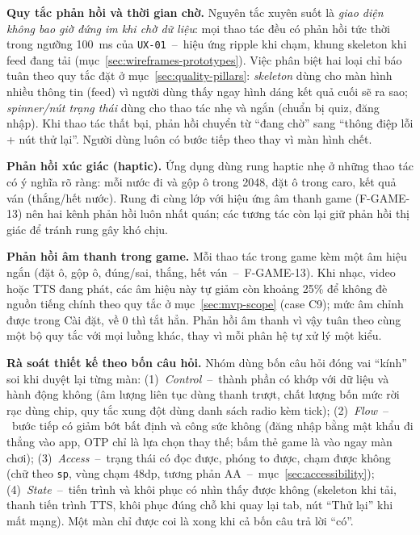 \textbf{Quy tắc phản hồi và thời gian chờ.} Nguyên tắc xuyên suốt là \textit{giao diện không bao giờ đứng im khi chờ dữ liệu}: mọi thao tác đều có phản hồi tức thời trong ngưỡng 100~ms của \texttt{UX-01}~--~hiệu ứng ripple khi chạm, khung skeleton khi feed đang tải (mục~\ref{sec:wireframes-prototypes}). Việc phân biệt hai loại chỉ báo tuân theo quy tắc đặt ở mục~\ref{sec:quality-pillars}: \textit{skeleton} dùng cho màn hình nhiều thông tin (feed) vì người dùng thấy ngay hình dáng kết quả cuối sẽ ra sao; \textit{spinner/nút trạng thái} dùng cho thao tác nhẹ và ngắn (chuẩn bị quiz, đăng nhập). Khi thao tác thất bại, phản hồi chuyển từ ``đang chờ'' sang ``thông điệp lỗi + nút thử lại''. Người dùng luôn có bước tiếp theo thay vì màn hình chết.

\textbf{Phản hồi xúc giác (haptic).} Ứng dụng dùng rung haptic nhẹ ở những thao tác có ý nghĩa rõ ràng: mỗi nước đi và gộp ô trong 2048, đặt ô trong caro, kết quả ván (thắng/hết nước). Rung đi cùng lớp với hiệu ứng âm thanh game (F-GAME-13) nên hai kênh phản hồi luôn nhất quán; các tương tác còn lại giữ phản hồi thị giác để tránh rung gây khó chịu.

\textbf{Phản hồi âm thanh trong game.} Mỗi thao tác trong game kèm một âm hiệu ngắn (đặt ô, gộp ô, đúng/sai, thắng, hết ván~--~F-GAME-13). Khi nhạc, video hoặc TTS đang phát, các âm hiệu này tự giảm còn khoảng 25\% để không đè nguồn tiếng chính theo quy tắc ở mục~\ref{sec:mvp-scope} (case C9); mức âm chỉnh được trong Cài đặt, về 0 thì tắt hẳn. Phản hồi âm thanh vì vậy tuân theo cùng một bộ quy tắc với mọi luồng khác, thay vì mỗi phân hệ tự xử lý một kiểu.

\textbf{Rà soát thiết kế theo bốn câu hỏi.} Nhóm dùng bốn câu hỏi đóng vai ``kính'' soi khi duyệt lại từng màn: (1)~\textit{Control}~--~thành phần có khớp với dữ liệu và hành động không (âm lượng liên tục dùng thanh trượt, chất lượng bốn mức rời rạc dùng chip, quy tắc xung đột dùng danh sách radio kèm tick); (2)~\textit{Flow}~--~bước tiếp có giảm bớt bất định và công sức không (đăng nhập bằng mật khẩu đi thẳng vào app, OTP chỉ là lựa chọn thay thế; bấm thẻ game là vào ngay màn chơi); (3)~\textit{Access}~--~trạng thái có đọc được, phóng to được, chạm được không (chữ theo \texttt{sp}, vùng chạm 48dp, tương phản AA~--~mục~\ref{sec:accessibility}); (4)~\textit{State}~--~tiến trình và khôi phục có nhìn thấy được không (skeleton khi tải, thanh tiến trình TTS, khôi phục đúng chỗ khi quay lại tab, nút ``Thử lại'' khi mất mạng). Một màn chỉ được coi là xong khi cả bốn câu trả lời ``có''.
